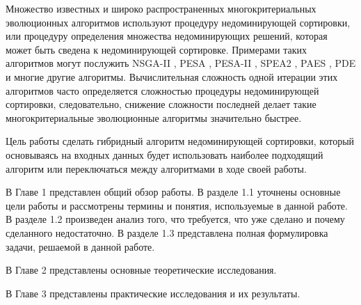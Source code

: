 \startprefacepage

Множество известных и широко распространенных многокритериальных эволюционных алгоритмов используют процедуру недоминирующей сортировки, или процедуру определения множества недоминирующих решений, которая может быть сведена к недоминирующей сортировке. Примерами таких алгоритмов могут послужить NSGA-II \cite{NSGA-II}, PESA \cite{PESA}, PESA-II \cite{PESA-II}, SPEA2 \cite{SPEA2}, PAES \cite{PAES}, PDE \cite{PDE} и многие другие алгоритмы. Вычислительная сложность одной итерации этих алгоритмов часто определяется сложностью процедуры недоминирующей сортировки, следовательно, снижение сложности последней делает такие многокритериальные эволюционные алгоритмы значительно быстрее.

Цель работы сделать гибридный алгоритм недоминирующей сортировки, который основываясь на входных данных будет использовать наиболее подходящий алгоритм или переключаться между алгоритмами в ходе своей работы.

В Главе 1 представлен общий обзор работы. В разделе 1.1 уточнены основные цели работы и рассмотрены термины и понятия, используемые в данной работе. В разделе 1.2 произведен анализ того, что требуется, что уже сделано и почему сделанного недостаточно. В разделе 1.3 представлена полная формулировка задачи, решаемой в данной работе.

В Главе 2 представлены основные теоретические исследования. 

В Главе 3 представлены практические исследования и их результаты.


